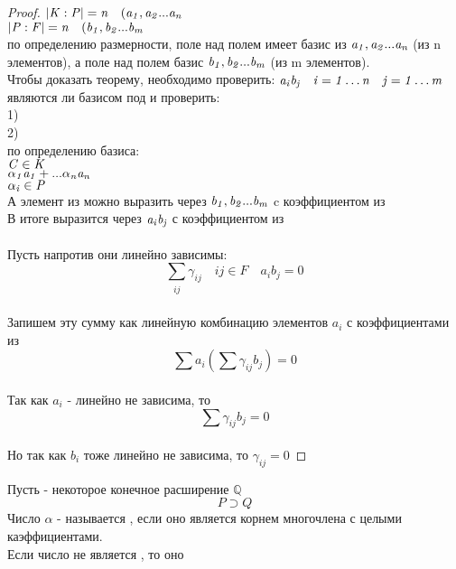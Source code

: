 \begin{proof}
  $\mathit {|K:P|=n \quad (a_{1}, a_{2}...a_{n}}$ \\
  $\mathit {|P:F|=n \quad (b_{1}, b_{2}...b_{m}}$ \\
  по определению размерности, поле  над полем  имеет базис из
  $\mathit {a_{1}, a_{2}...a_{n}}$ (из n элементов), а поле  над полем 
  базис $\mathit {b_{1}, b_{2}...b_{m}}$ (из m элементов). \\
  Чтобы доказать теорему, необходимо проверить: $\mathit{a_i b_j \quad i = 1 \ldots
  n \quad j = 1 \ldots m}$ \\
  являются ли базисом  под  и проверить: \\
  1)  \\
  2)  \\
  по определению базиса: \\
  $\mathit {C \in K}$ \\
  $\mathit {\alpha_{1} a_{1}+...\alpha_{n}a_{n}}$\\
  $\mathit{\alpha_{i} \in P}$ \\
  А элемент из  можно выразить через $\mathit {b_{1}, b_{2}...b_{m}}$ c
  коэффициентом из  \\
  В итоге  выразится через $\mathit{a_{i}b_{j}}$ с коэффициентом из  \\

  \\
  Пусть напротив они линейно зависимы: \\
  \[ \sum_{\substack {ij}} \gamma_{ij} \quad ij \in F \quad a_{i}b_{j} = 0\] \\
  Запишем эту сумму как линейную комбинацию элементов $a_i$ с коэффициентами из
   \\
  \[ \sum a_{i} \left ( \sum \gamma_{ij} b_{j} \right) = 0 \] \\
  Так как $a_{i}$ - линейно не зависима, то \\
  \[\sum \gamma_{ij} b_{j} = 0\] \\
  Но так как $b_{i}$ тоже линейно не зависима, то $\gamma_{ij}=0$
\end{proof}

\begin{defin}
  Пусть  - некоторое конечное расширение $\mathbb Q$\\
  \[P \supset Q \]
  Число $\alpha$ - называется , если оно является корнем
  многочлена с целыми каэффициентами. \\
  Если число не является , то оно 
\end{defin}


